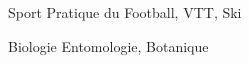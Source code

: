 

\begin{cvpairs}

  
\cvpair
    {Sport} %
    {Pratique du Football, VTT, Ski} %


\cvpair
    {Biologie} %
    {Entomologie, Botanique} %

\end{cvpairs}